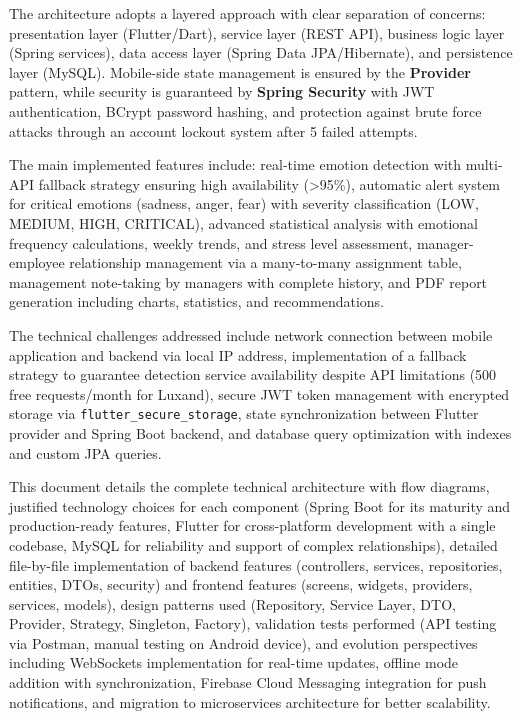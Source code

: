 \documentclass[a4paper,11pt]{report}
\begin{document}
The architecture adopts a layered approach with clear separation of concerns: presentation layer (Flutter/Dart), service layer (REST API), business logic layer (Spring services), data access layer (Spring Data JPA/Hibernate), and persistence layer (MySQL). Mobile-side state management is ensured by the \textbf{Provider} pattern, while security is guaranteed by \textbf{Spring Security} with JWT authentication, BCrypt password hashing, and protection against brute force attacks through an account lockout system after 5 failed attempts.

The main implemented features include: real-time emotion detection with multi-API fallback strategy ensuring high availability (>95\%), automatic alert system for critical emotions (sadness, anger, fear) with severity classification (LOW, MEDIUM, HIGH, CRITICAL), advanced statistical analysis with emotional frequency calculations, weekly trends, and stress level assessment, manager-employee relationship management via a many-to-many assignment table, management note-taking by managers with complete history, and PDF report generation including charts, statistics, and recommendations.

The technical challenges addressed include network connection between mobile application and backend via local IP address, implementation of a fallback strategy to guarantee detection service availability despite API limitations (500 free requests/month for Luxand), secure JWT token management with encrypted storage via \texttt{flutter\_secure\_storage}, state synchronization between Flutter provider and Spring Boot backend, and database query optimization with indexes and custom JPA queries.

This document details the complete technical architecture with flow diagrams, justified technology choices for each component (Spring Boot for its maturity and production-ready features, Flutter for cross-platform development with a single codebase, MySQL for reliability and support of complex relationships), detailed file-by-file implementation of backend features (controllers, services, repositories, entities, DTOs, security) and frontend features (screens, widgets, providers, services, models), design patterns used (Repository, Service Layer, DTO, Provider, Strategy, Singleton, Factory), validation tests performed (API testing via Postman, manual testing on Android device), and evolution perspectives including WebSockets implementation for real-time updates, offline mode addition with synchronization, Firebase Cloud Messaging integration for push notifications, and migration to microservices architecture for better scalability.
\end{document}
